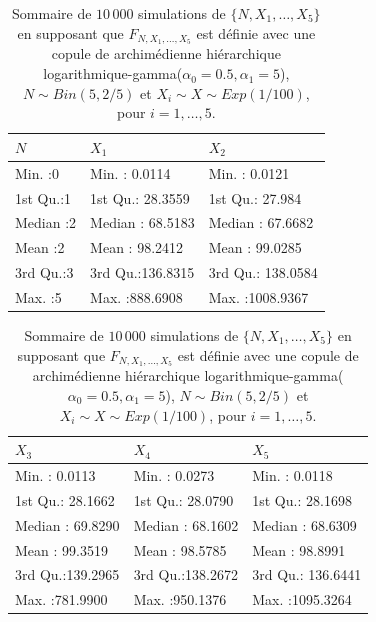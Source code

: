 \documentclass{article}
\begin{document}
		\begin{table}[H]
			\centering
			\begin{tabular}{lll}
				\hline
				       $N$ &       $X_1$ &       $X_2$        \\ 
				\hline
				  Min.   :0   & Min.   :  0.0114   & Min.   :   0.0121    \\ 
				  1st Qu.:1   & 1st Qu.: 28.3559   & 1st Qu.:  27.984    \\ 
				  Median :2   & Median : 68.5183   & Median :  67.6682   \\ 
				  Mean   :2   & Mean   : 98.2412   & Mean   :  99.0285    \\ 
				  3rd Qu.:3   & 3rd Qu.:136.8315   & 3rd Qu.: 138.0584      \\ 
				  Max.   :5   & Max.   :888.6908   & Max.   :1008.9367     \\ 
				\hline
			\end{tabular}
			\begin{tabular}{lll}
				\hline
				          $X_3$ &       $X_4$ &       $X_5$ \\ 
				\hline
				  Min.   :  0.0113   & Min.   :  0.0273   & Min.   :   0.0118   \\ 
				  1st Qu.: 28.1662   & 1st Qu.: 28.0790   & 1st Qu.:  28.1698   \\ 
				  Median : 69.8290   & Median : 68.1602   & Median :  68.6309   \\ 
				  Mean   : 99.3519   & Mean   : 98.5785   & Mean   :  98.8991   \\ 
				  3rd Qu.:139.2965   & 3rd Qu.:138.2672   & 3rd Qu.: 136.6441   \\ 
				  Max.   :781.9900   & Max.   :950.1376   & Max.   :1095.3264   \\
				\hline
			\end{tabular}
		\caption[Sommaire des données simulées pour le scénario \ref{scenario_log_gamma}]{Sommaire de $10\,000$ simulations de $\{N, X_1, \dots, X_5\}$ en supposant que $F_{N,X_1,\dots, X_5}$ est définie avec une copule de archimédienne hiérarchique logarithmique-gamma($\alpha_0=0.5, \alpha_1 = 5$), $N \sim Bin(5, 2/5)$ et $X_i \sim X \sim Exp(1/100)$, pour $i=1,\dots, 5$.}
		\label{tbl_sommaire_log_gamma}
		\end{table}
		
\end{document}
